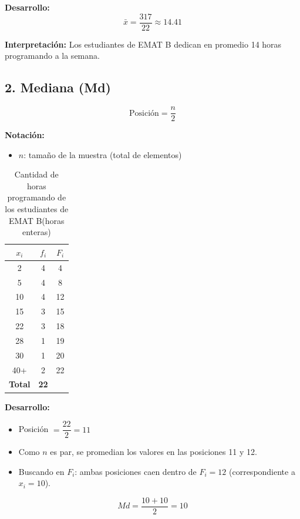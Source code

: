 \documentclass[12pt,letterpaper]{article}
\begin{document}
\textbf{Desarrollo:}
\begin{equation*}
    \bar{x} = \frac{317}{22} \approx 14.41
\end{equation*}

\textbf{Interpretación:} Los estudiantes de EMAT B dedican en promedio 14 horas programando a la semana.

\subsection*{2. Mediana (Md)}
\begin{equation*}
    \text{Posición} = \frac{n}{2}
\end{equation*}

\textbf{Notación:}
\begin{itemize}
    \item $n$: tamaño de la muestra (total de elementos)
\end{itemize}

\begin{table}[H]
    \centering
    \caption{Cantidad de horas programando de los estudiantes de EMAT B(horas enteras)}
    \label{tab:mediana-cuantiles-horas}
    \begin{tabular}{@{}ccc@{}}
        \toprule
        $x_i$ & $f_i$ & $F_i$ \\
        \midrule
        2 & 4 & 4 \\
        5 & 4 & 8 \\
        10 & 4 & 12 \\
        15 & 3 & 15 \\
        22 & 3 & 18 \\
        28 & 1 & 19 \\
        30 & 1 & 20 \\
        40+ & 2 & 22 \\
        \midrule
        \textbf{Total} & \textbf{22} & \\
        \bottomrule
    \end{tabular}
\end{table}

\textbf{Desarrollo:}

\begin{itemize}
    \item Posición $= \dfrac{22}{2} = 11$
    \item Como $n$ es par, se promedian los valores en las posiciones 11 y 12.
    \item Buscando en $F_i$: ambas posiciones caen dentro de $F_i = 12$ (correspondiente a $x_i = 10$).
\end{itemize}
\begin{equation*}
    Md = \frac{10 + 10}{2} = 10
\end{equation*}
\end{document}
